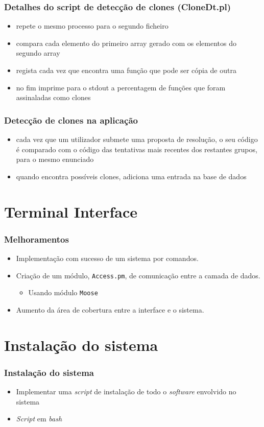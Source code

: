\documentclass{beamer}
\begin{document}
\begin{frame}[fragile] \frametitle{Detalhes do script de detecção de clones (CloneDt.pl)}
\begin{itemize}
\item repete o mesmo processo para o segundo ficheiro
\item compara cada elemento do primeiro array gerado com os elementos do segundo array
\item regista cada vez que encontra uma função que pode ser cópia de outra
\item no fim imprime para o stdout a percentagem de funções que foram assinaladas como clones
\end{itemize}
\end{frame}

\begin{frame}[fragile] \frametitle{Detecção de clones na aplicação}
\begin{itemize}
\item cada vez que um utilizador submete uma proposta de resolução, o seu código é comparado com o código das tentativas mais recentes dos restantes grupos, para o mesmo enunciado
\item quando encontra possíveis clones, adiciona uma entrada na base de dados
\end{itemize}
\end{frame}


\section{Terminal Interface}
\begin{frame}[fragile] \frametitle{Melhoramentos}
\begin{itemize}
 \item Implementação com sucesso de um sistema por comandos.
 \item Criação de um módulo, \texttt{Access.pm}, de comunicação entre a camada de dados.
\begin{itemize}
 \item Usando módulo \texttt{Moose}
\end{itemize}
 \item Aumento da área de cobertura entre a interface e o sistema.
\end{itemize}
\end{frame}

\section{Instalação do sistema}
\begin{frame}[fragile] \frametitle{Instalação do sistema}
\begin{itemize}
 \item Implementar uma \emph{script} de instalação de todo o \emph{software} envolvido no sistema
 \item \emph{Script} em \emph{bash}
\end{itemize}
\end{frame}
\end{document}
